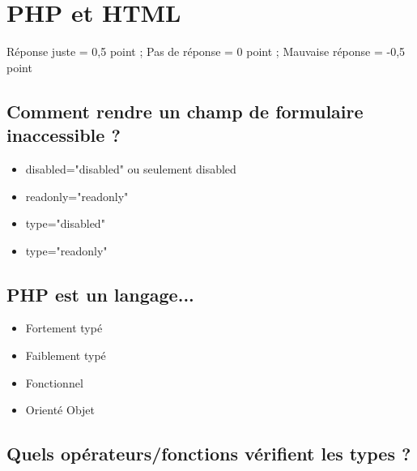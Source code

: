 \documentclass[11pt,a4paper]{article}
\begin{document}
\MakeExamTitle                   %


\section{PHP et HTML}

\medskip

Réponse juste = 0,5 point ; Pas de réponse = 0 point ; Mauvaise réponse = -0,5 point

\medskip

\subsection{Comment rendre un champ de formulaire inaccessible ?}

\begin{itemize}
\item[\CaseCoche] disabled="disabled" ou seulement disabled \\
\item[\CaseCoche] readonly="readonly" \\
\item[\CaseCoche] type="disabled" \\
\item[\CaseCoche] type="readonly" \\
\end{itemize}


\subsection{PHP est un langage...}

\begin{itemize}
\item[\CaseCoche] Fortement typé\\
\item[\CaseCoche] Faiblement typé\\  %
\item[\CaseCoche] Fonctionnel\\
\item[\CaseCoche] Orienté Objet\\  %
\end{itemize}


\subsection{Quels opérateurs/fonctions vérifient les types ?}
\end{document}

